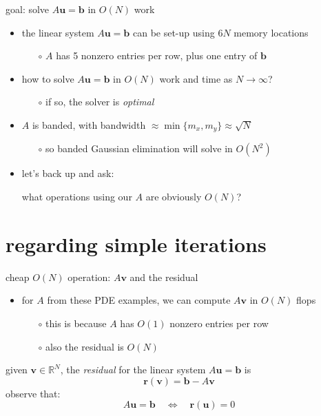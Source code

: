 \documentclass[10pt,
               svgnames,
               hyperref={colorlinks,citecolor=DeepPink4,linkcolor=FireBrick,urlcolor=Maroon},
               usepdftitle=false]{beamer}
\newcommand{\bb}{\mathbf{b}}
\newcommand{\br}{\mathbf{r}}
\newcommand{\bu}{\mathbf{u}}
\newcommand{\bv}{\mathbf{v}}
\newcommand{\RR}{\mathbb{R}}
\begin{document}
\begin{frame}{goal: solve $A\bu=\bb$ in $O(N)$ work}
\begin{itemize}
\item the linear system $A\bu=\bb$ can be set-up using  $6N$ memory locations
	\begin{itemize}
	\item[$\circ$] $A$ has 5 nonzero entries per row, plus one entry of $\bb$
	\end{itemize}
\item how to solve $A\bu=\bb$ in $O(N)$ work and time as $N\to\infty$?
	\begin{itemize}
	\item[$\circ$] if so, the solver is \emph{optimal}
	\end{itemize}

\bigskip
\item<2-> $A$ is banded, with bandwidth $\approx \min\{m_x,m_y\} \approx \sqrt{N}$
	\begin{itemize}
	\item[$\circ$] so banded Gaussian elimination will solve in $O(N^2)$
	\end{itemize}

\bigskip
\item<3> let's back up and ask:

\medskip
\qquad what operations using our $A$ are obviously $O(N)$?
\end{itemize}
\end{frame}


\section{regarding simple iterations}

\begin{frame}{cheap $O(N)$ operation: $A\bv$ and the residual}
\begin{itemize}
\item for $A$ from these PDE examples, we can compute $A\bv$ in $O(N)$ flops
	\begin{itemize}
	\item[$\circ$] this is because $A$ has $O(1)$ nonzero entries per row
	\item[$\circ$] also the residual is $O(N)$
	\end{itemize}
\end{itemize}

\bigskip
\begin{definition} given $\bv \in\RR^N$, the \emph{residual} for the linear system $A\bu=\bb$ is
	$$\br(\bv) = \bb - A\bv$$
observe that:
    $$A\bu = \bb \quad \iff \quad \br(\bu) = 0$$
\end{definition}
\end{frame}
\end{document}

